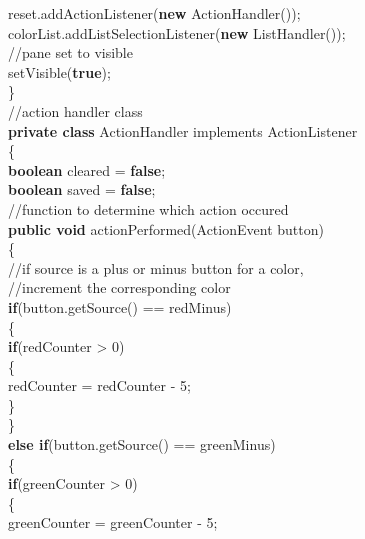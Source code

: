 \documentclass[12pt]{article}
\begin{document}
\begin{flushleft}
{\qquad \qquad \qquad			reset.addActionListener(\textbf{new} ActionHandler());\\
\qquad \qquad \qquad			colorList.addListSelectionListener(\textbf{new} ListHandler());\\
			[2mm]
\qquad \qquad \qquad			//pane set to visible\\
\qquad \qquad \qquad			setVisible(\textbf{true});\\
\qquad \qquad 		\}\\
		[2mm]
\qquad \qquad		//action handler class\\
\qquad \qquad		\textbf{private class} ActionHandler implements ActionListener\\ 
\qquad \qquad		\{\\     
			[2mm]
\qquad \qquad \qquad			\textbf{boolean} cleared = \textbf{false};\\
\qquad \qquad \qquad			\textbf{boolean} saved = \textbf{false};\\
			[2mm]
\qquad \qquad \qquad			//function to determine which action occured\\
\qquad \qquad \qquad			\textbf{public void} actionPerformed(ActionEvent button)\\
\qquad \qquad \qquad			\{\\
\qquad \qquad \qquad \qquad				//if source is a plus or minus button for a color,\\
\qquad \qquad \qquad \qquad //increment the corresponding color\\
\qquad \qquad \qquad \qquad				\textbf{if}(button.getSource() == redMinus)\\
\qquad \qquad \qquad \qquad				\{\\
\qquad \qquad \qquad \qquad \qquad						\textbf{if}(redCounter > 0)\\
\qquad \qquad \qquad \qquad \qquad					\{\\
	\qquad \qquad \qquad \qquad	\qquad \qquad					redCounter = redCounter - 5;\\
\qquad \qquad \qquad \qquad \qquad					\}\\
\qquad \qquad \qquad \qquad					\}\\
\qquad \qquad \qquad \qquad					\textbf{else if}(button.getSource() == greenMinus)\\
\qquad \qquad \qquad \qquad					\{\\
\qquad \qquad \qquad \qquad	\qquad					\textbf{if}(greenCounter > 0)\\
\qquad \qquad \qquad \qquad	\qquad					\{\\
\qquad \qquad \qquad \qquad	\qquad	\qquad					greenCounter = greenCounter - 5;\\
}
\end{flushleft}
\end{document}
